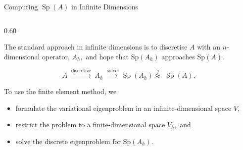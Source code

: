 \documentclass[aspectratio=169]{beamer}
\begin{document}


\begin{frame}{Computing \(\operatorname{Sp}(A)\) in Infinite Dimensions}

\begin{columns}[T,onlytextwidth]

\begin{column}{0.60\textwidth}

The standard approach in infinite dimensions is to discretise $A$ with an $n$-dimensional operator, $A_h,$ and hope that $\text{Sp}(A_h)$ approaches $\text{Sp}(A).$


\vspace{0.2cm}

\[
A
\;\xrightarrow{\text{discretize}}\;
A_h
\;\xrightarrow{\text{solve}}\;
\operatorname{Sp}(A_h)
\stackrel{?}{\approx}\;
\operatorname{Sp}(A).
\]

\vspace{0.3cm}

To use the finite element method, we
\begin{itemize}
    \item formulate the variational eigenproblem in an infinite-dimensional space \(V\),
    \item restrict the problem to a finite-dimensional space $V_h,$ and
    \item solve the discrete eigenproblem for $\text{Sp}(A_h).$
\end{itemize}


\end{column}
\end{columns}
\end{frame}
\end{document}
